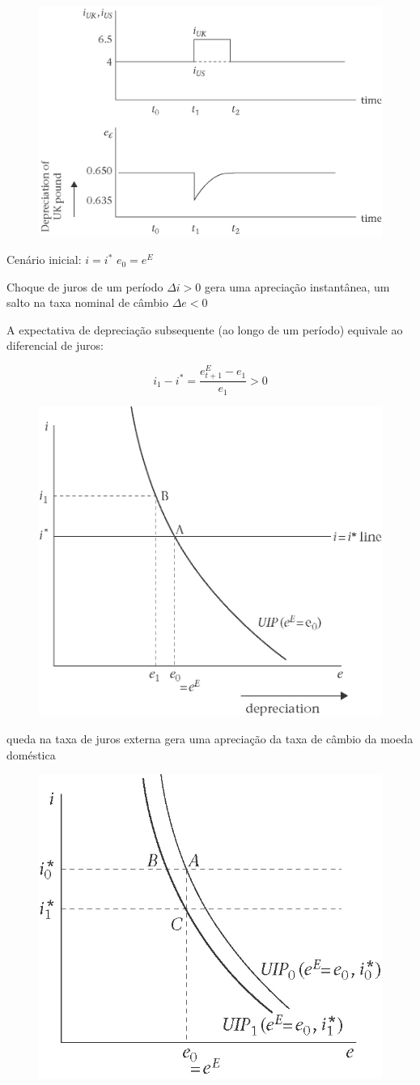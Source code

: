 \documentclass[a4paper,12pt]{article}[abntex2]
\begin{document}
\begin{figure}[H]
    \centering
    \includegraphics[width=0.7\linewidth]{Imagens/a22i4.png}
\end{figure}

Cenário inicial:  
\( i = i^* \)  
\( e_0 = e^E \)  

Choque de juros de um período \( \Delta i > 0 \)  
gera uma apreciação instantânea, um salto na taxa nominal de câmbio \( \Delta e < 0 \)  

A expectativa de depreciação subsequente (ao longo de um período) equivale ao diferencial de juros:

\[
i_1 - i^* = \frac{e_{t+1}^E - e_1}{e_1} > 0
\]

\begin{figure}[H]
    \centering
    \includegraphics[width=0.7\linewidth]{Imagens/a22i5.png}
\end{figure}

queda na taxa de juros externa gera uma  apreciação da taxa de câmbio da moeda doméstica

\begin{figure}
    \centering
    \includegraphics[width=0.5\linewidth]{Imagens/a22i6.png}
\end{figure}
\end{document}
